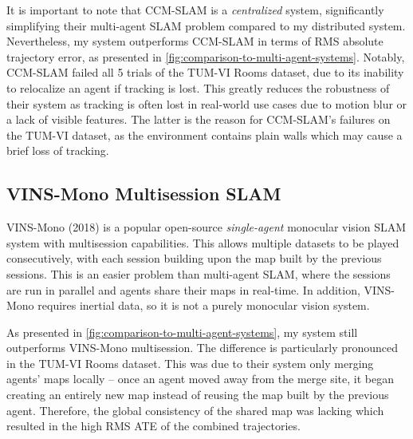 It is important to note that CCM-SLAM is a \textit{centralized} system, significantly simplifying their multi-agent SLAM problem compared to my distributed system. Nevertheless, my system outperforms CCM-SLAM in terms of RMS absolute trajectory error, as presented in \autoref{fig:comparison-to-multi-agent-systems}. Notably, CCM-SLAM failed all 5 trials of the TUM-VI Rooms dataset, due to its inability to relocalize an agent if tracking is lost. This greatly reduces the robustness of their system as tracking is often lost in real-world use cases due to motion blur or a lack of visible features. The latter is the reason for CCM-SLAM's failures on the TUM-VI dataset, as the environment contains plain walls which may cause a brief loss of tracking.


\subsection{VINS-Mono Multisession SLAM}
VINS-Mono (2018) \autocite{8421746} is a popular open-source \textit{single-agent} monocular vision SLAM system with multisession capabilities. This allows multiple datasets to be played consecutively, with each session building upon the map built by the previous sessions. This is an easier problem than multi-agent SLAM, where the sessions are run in parallel and agents share their maps in real-time. In addition, VINS-Mono requires inertial data, so it is not a purely monocular vision system.

As presented in \autoref{fig:comparison-to-multi-agent-systems}, my system still outperforms VINS-Mono multisession. The difference is particularly pronounced in the TUM-VI Rooms dataset. This was due to their system only merging agents' maps locally – once an agent moved away from the merge site, it began creating an entirely new map instead of reusing the map built by the previous agent. Therefore, the global consistency of the shared map was lacking which resulted in the high RMS ATE of the combined trajectories.


